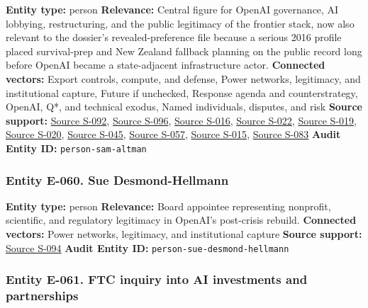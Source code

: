 \documentclass[
  american,
  11pt,
  letterpaper,
]{article}
\begin{document}
\textbf{Entity type:} person \textbf{Relevance:} Central figure for
OpenAI governance, AI lobbying, restructuring, and the public legitimacy
of the frontier stack, now also relevant to the dossier's
revealed-preference file because a serious 2016 profile placed
survival-prep and New Zealand fallback planning on the public record
long before OpenAI became a state-adjacent infrastructure actor.
\textbf{Connected vectors:} Export controls, compute, and defense, Power
networks, legitimacy, and institutional capture, Future if unchecked,
Response agenda and counterstrategy, OpenAI, Q*, and technical exodus,
Named individuals, disputes, and risk \textbf{Source support:}
\hyperref[source-s-092-openai-announces-leadership-transition]{Source
S-092},
\hyperref[source-s-096-openais-proposals-for-the-us-ai-action-plan]{Source
S-096},
\hyperref[source-s-016-openai-has-full-confidence-in-ceo-sam-altman-after-investigation-reinstates-him-to-board]{Source
S-016},
\hyperref[source-s-022-openai-may-move-forward-with-new-business-structure-partnership-with-microsoft-regulators-say]{Source
S-022},
\hyperref[source-s-019-how-elon-musk-97-4-billion-bid-complicates-matters-for-openai]{Source
S-019},
\hyperref[source-s-020-openai-says-musk-agreed-the-chatgpt-maker-should-become-a-for-profit-company]{Source
S-020}, \hyperref[source-s-045-musk-v-altman-4-24-cv-04722]{Source
S-045},
\hyperref[source-s-057-judge-denies-elon-musks-attempt-to-immediately-block-openais-conversion-to-for-profit-entity]{Source
S-057},
\hyperref[source-s-015-judge-denies-elon-musk-s-request-to-block-openai-for-profit-conversion-but-welcomes-trial]{Source
S-015}, \hyperref[source-s-083-sam-altman-s-manifest-destiny]{Source
S-083} \textbf{Audit Entity ID:} \texttt{person-sam-altman}

\subsubsection{Entity E-060. Sue
Desmond-Hellmann}\label{entity-e-060-sue-desmond-hellmann}

\textbf{Entity type:} person \textbf{Relevance:} Board appointee
representing nonprofit, scientific, and regulatory legitimacy in
OpenAI's post-crisis rebuild. \textbf{Connected vectors:} Power
networks, legitimacy, and institutional capture \textbf{Source support:}
\hyperref[source-s-094-openai-announces-new-members-to-board-of-directors]{Source
S-094} \textbf{Audit Entity ID:} \texttt{person-sue-desmond-hellmann}

\subsubsection{Entity E-061. FTC inquiry into AI investments and
partnerships}\label{entity-e-061-ftc-inquiry-into-ai-investments-and-partnerships}
\end{document}
